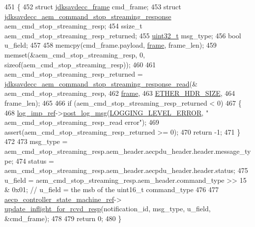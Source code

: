 \begin{DoxyCode}
451 \{
452     \textcolor{keyword}{struct }\hyperlink{structjdksavdecc__frame}{jdksavdecc\_frame} cmd\_frame;
453     \textcolor{keyword}{struct }\hyperlink{structjdksavdecc__aem__command__stop__streaming__response}{jdksavdecc\_aem\_command\_stop\_streaming\_response} 
      aem\_cmd\_stop\_streaming\_resp;
454     ssize\_t aem\_cmd\_stop\_streaming\_resp\_returned;
455     \hyperlink{parse_8c_a6eb1e68cc391dd753bc8ce896dbb8315}{uint32\_t} msg\_type;
456     \textcolor{keywordtype}{bool} u\_field;
457 
458     memcpy(cmd\_frame.payload, \hyperlink{gst__avb__playbin_8c_ac8e710e0b5e994c0545d75d69868c6f0}{frame}, frame\_len);
459     memset(&aem\_cmd\_stop\_streaming\_resp, 0, \textcolor{keyword}{sizeof}(aem\_cmd\_stop\_streaming\_resp));
460 
461     aem\_cmd\_stop\_streaming\_resp\_returned = 
      \hyperlink{group__command__stop__streaming__response_ga50d25eaa408322fe1b3ca4ca1bc8fa19}{jdksavdecc\_aem\_command\_stop\_streaming\_response\_read}(&
      aem\_cmd\_stop\_streaming\_resp,
462                                                                                                
      \hyperlink{gst__avb__playbin_8c_ac8e710e0b5e994c0545d75d69868c6f0}{frame},
463                                                                                                
      \hyperlink{namespaceavdecc__lib_a6c827b1a0d973e18119c5e3da518e65ca9512ad9b34302ba7048d88197e0a2dc0}{ETHER\_HDR\_SIZE},
464                                                                                                frame\_len);
465 
466     \textcolor{keywordflow}{if} (aem\_cmd\_stop\_streaming\_resp\_returned < 0)
467     \{
468         \hyperlink{namespaceavdecc__lib_acbe3e2a96ae6524943ca532c87a28529}{log\_imp\_ref}->\hyperlink{classavdecc__lib_1_1log_a68139a6297697e4ccebf36ccfd02e44a}{post\_log\_msg}(\hyperlink{namespaceavdecc__lib_a501055c431e6872ef46f252ad13f85cdaf2c4481208273451a6f5c7bb9770ec8a}{LOGGING\_LEVEL\_ERROR}, \textcolor{stringliteral}{"
      aem\_cmd\_stop\_streaming\_resp\_read error"});
469         assert(aem\_cmd\_stop\_streaming\_resp\_returned >= 0);
470         \textcolor{keywordflow}{return} -1;
471     \}
472 
473     msg\_type = aem\_cmd\_stop\_streaming\_resp.aem\_header.aecpdu\_header.header.message\_type;
474     status = aem\_cmd\_stop\_streaming\_resp.aem\_header.aecpdu\_header.header.status;
475     u\_field = aem\_cmd\_stop\_streaming\_resp.aem\_header.command\_type >> 15 & 0x01; \textcolor{comment}{// u\_field = the msb of the
       uint16\_t command\_type}
476 
477     \hyperlink{namespaceavdecc__lib_a0b1b5aea3c0490f77cbfd9178af5be22}{aecp\_controller\_state\_machine\_ref}->
      \hyperlink{classavdecc__lib_1_1aecp__controller__state__machine_a997abd9786c330a5505e903e6443208e}{update\_inflight\_for\_rcvd\_resp}(notification\_id, msg\_type, u\_field, &cmd\_frame);
478 
479     \textcolor{keywordflow}{return} 0;
480 \}
\end{DoxyCode}


